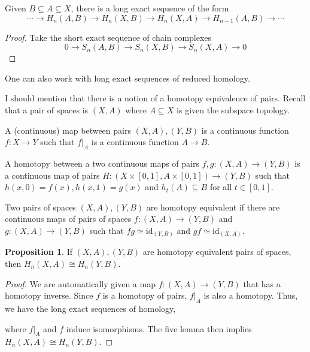 \documentclass[12pt,reqno]{amsart}
\numberwithin{theorem}{section}
\theoremstyle{definition}
\theoremstyle{remark}
\numberwithin{equation}{section}
\theoremstyle{definition}
\newtheorem{prop}[theorem]{Proposition}
\newcommand{\id}{\mathrm{id}}
\begin{document}
\begin{corollary}
    Given $B\subseteq A \subseteq X$, there is a long exact sequence of the form 
    $$\cdots \rightarrow H_n(A,B) \rightarrow H_n(X,B) \rightarrow H_n(X,A) \rightarrow H_{n-1}(A,B) \rightarrow \cdots $$
\end{corollary}
\begin{proof}
    Take the short exact sequence of chain complexes
    $$0\rightarrow S_n(A,B) \rightarrow S_n(X,B) \rightarrow S_n(X,A) \rightarrow 0 $$
\end{proof}
\begin{remark}
    One can also work with long exact sequences of reduced homology.
\end{remark}
I should mention that there is a notion of a homotopy equivalence of pairs. Recall that a pair of spaces is $(X,A)$ where $A\subseteq X$ is given the subspace topology.
\begin{definition}
    A (continuous) map between pairs $(X,A),(Y,B)$ is a continuous function $f:X\rightarrow Y$ such that $f|_A$ is a continuous function $A\rightarrow B$.
\end{definition}
\begin{definition}
    A homotopy between a two continuous maps of pairs $f,g:(X,A)\rightarrow (Y,B)$ is a continuous map of pairs $H:(X\times [0,1],A\times [0,1]) \rightarrow (Y,B)$ such that $h(x,0)=f(x),h(x,1)=g(x)$ and $h_t(A) \subseteq B$ for all $t \in [0,1]$.
\end{definition}
\begin{definition}
    Two pairs of spaces $(X,A),(Y,B)$ are homotopy equivalent if there are continuous maps of pairs of spaces $f:(X,A)\rightarrow (Y,B)$ and $g:(X,A)\rightarrow (Y,B)$ such that $fg \simeq \id_{(Y,B)}$ and $gf \simeq \id_{(X,A)}$.
\end{definition}
\begin{prop}\label{proph}
    If $(X,A), (Y,B)$ are homotopy equivalent pairs of spaces, then $H_n(X,A) \cong H_n(Y,B)$.
\end{prop}
\begin{proof}
    We are automatically given a map $f:(X,A)\rightarrow (Y,B)$ that has a homotopy inverse. Since $f$ is a homotopy of pairs, $f|_A$ is also a homotopy. Thus, we have the long exact sequences of homology,
    \begin{center}
    \end{center}
    where $f|_A$ and $f$ induce isomorphisms. The five lemma then implies $H_n(X,A) \cong H_n(Y,B)$.
\end{proof}
\end{document}
